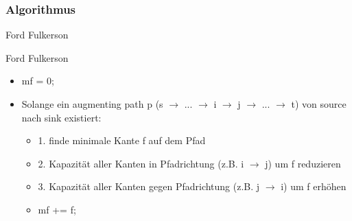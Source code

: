 \subsubsection{Algorithmus}
\begin{frame}{Ford Fulkerson}
  \begin{block}{Ford Fulkerson}
    \begin{itemize}
      \item mf = 0;
      \pause
      \item Solange ein augmenting path p (s $\rightarrow$ ...  $\rightarrow$ i $\rightarrow$ j $\rightarrow$ ... $\rightarrow$ t) von source nach sink existiert:
      \pause
      \begin{itemize}
      \item 1. finde minimale Kante f auf dem Pfad
      \pause
      \item 2. Kapazität aller Kanten in Pfadrichtung (z.B. i $\rightarrow$ j) um f reduzieren
      \pause
      \item 3. Kapazität aller Kanten gegen Pfadrichtung (z.B. j $\rightarrow$ i) um f erhöhen
      \pause
      \item mf += f;
      \end{itemize}
    \end{itemize}
  \end{block}
\end{frame}
